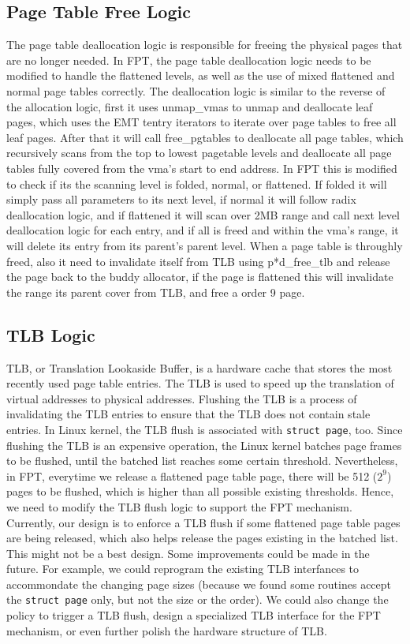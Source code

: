 \subsection{Page Table Free Logic}

The page table deallocation logic is responsible for freeing the physical pages that are no longer needed. In FPT, the page table deallocation logic needs to be modified to handle the flattened levels, as well as the use of mixed flattened and normal page tables correctly. The deallocation logic is similar to the reverse of the allocation logic, first it uses unmap_vmas to unmap and deallocate leaf pages, which uses the EMT tentry iterators to iterate over page tables to free all leaf pages. After that it will call free_pgtables to deallocate all page tables, which recursively scans from the top to lowest pagetable levels and deallocate all page tables fully covered from the vma's start to end address. In FPT this is modified to check if its the scanning level is folded, normal, or flattened. If folded it will simply pass all parameters to its next level, if normal it will follow radix deallocation logic, and if flattened it will scan over 2MB range and call next level deallocation logic for each entry, and if all is freed and within the vma's range, it will delete its entry from its parent's parent level. When a page table is throughly freed, also it need to invalidate itself from TLB using p*d_free_tlb and release the page back to the buddy allocator, if the page is flattened this will invalidate the range its parent cover from TLB, and free a order 9 page.

\subsection{TLB Logic}

TLB, or Translation Lookaside Buffer, is a hardware cache that stores the most recently used page table entries. The TLB is used to speed up the translation of virtual addresses to physical addresses. Flushing the TLB is a process of invalidating the TLB entries to ensure that the TLB does not contain stale entries. In Linux kernel, the TLB flush is associated with \texttt{struct page}, too. Since flushing the TLB is an expensive operation, the Linux kernel batches page frames to be flushed, until the batched list reaches some certain threshold. Nevertheless, in FPT, everytime we release a flattened page table page, there will be 512 ($2^9$) pages to be flushed, which is higher than all possible existing thresholds. Hence, we need to modify the TLB flush logic to support the FPT mechanism. Currently, our design is to enforce a TLB flush if some flattened page table pages are being released, which also helps release the pages existing in the batched list. This might not be a best design. Some improvements could be made in the future. For example, we could reprogram the existing TLB interfances to accommondate the changing page sizes (because we found some routines accept the \texttt{struct page} only, but not the size or the order). We could also change the policy to trigger a TLB flush, design a specialized TLB interface for the FPT mechanism, or even further polish the hardware structure of TLB.

